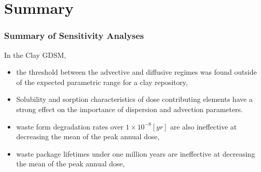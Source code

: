 
\section{Summary}
\begin{frame}[c]
  \frametitle{Summary of Sensitivity Analyses}
  In the Clay \gls{GDSM}, 
  \begin{itemize}
    \item the threshold between the advective and diffusive regimes was found 
      outside of the expected parametric range for a clay repository,
    \item Solubility and sorption characteristics of dose contributing elements 
      have a strong effect on the importance of dispersion and advection 
      parameters.
    \item waste form degradation rates over $1\times10^{-8} [yr]$ are also 
      ineffective at decreasing the mean of the peak annual dose,
    \item waste package lifetimes under one million years are ineffective at 
      decreasing the mean of the peak annual dose,
  \end{itemize}
\end{frame}
